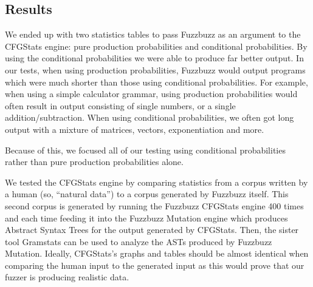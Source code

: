 \subsection{Results}

We ended up with two statistics tables to pass Fuzzbuzz as an argument to the
CFGStats engine: pure production probabilities and conditional probabilities.
By using the conditional probabilities we were able to produce far better
output. In our tests, when using production probabilities, Fuzzbuzz would
output programs which were much shorter than those using conditional
probabilities. For example, when using a simple calculator grammar,
using production probabilities would often result in output consisting of
single numbers, or a single addition/subtraction. When using conditional
probabilities, we often got long output with a mixture of matrices, vectors,
exponentiation and more.

Because of this, we focused all of our testing using conditional probabilities
rather than pure production probabilities alone.

We tested the CFGStats engine by comparing statistics from a corpus written by
a human (so, ``natural data'') to a corpus generated by Fuzzbuzz itself. This
second corpus is generated by running the Fuzzbuzz CFGStats engine 400 times and
each time feeding it into the Fuzzbuzz Mutation engine which produces Abstract
Syntax Trees for the output generated by CFGStats. Then, the sister tool
Gramstats can be used to analyze the ASTs produced by Fuzzbuzz Mutation.
Ideally, CFGStats's graphs and tables should be almost identical when comparing
the human input to the generated input as this would prove that our fuzzer is
producing realistic data.


